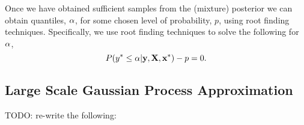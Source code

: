\documentclass[11pt, oneside]{article}
\begin{document}
Once we have obtained sufficient samples from the (mixture) posterior we can
obtain quantiles, $\alpha$, for some chosen level of probability, $p$, using
root finding techniques. Specifically, we use root finding techniques to solve
the following for $\alpha$,
\begin{equation}
    P\!\left({y^{*} \leq \alpha}\middle\vert{\ensuremath{\mathbf{y}}, \ensuremath{\mathbf{X}}, \ensuremath{\mathbf{x}}\ensuremath{^{*}}}\right) - p = 0.
\end{equation}

\subsection{Large Scale Gaussian Process Approximation}



TODO: re-write the following:
\end{document}
